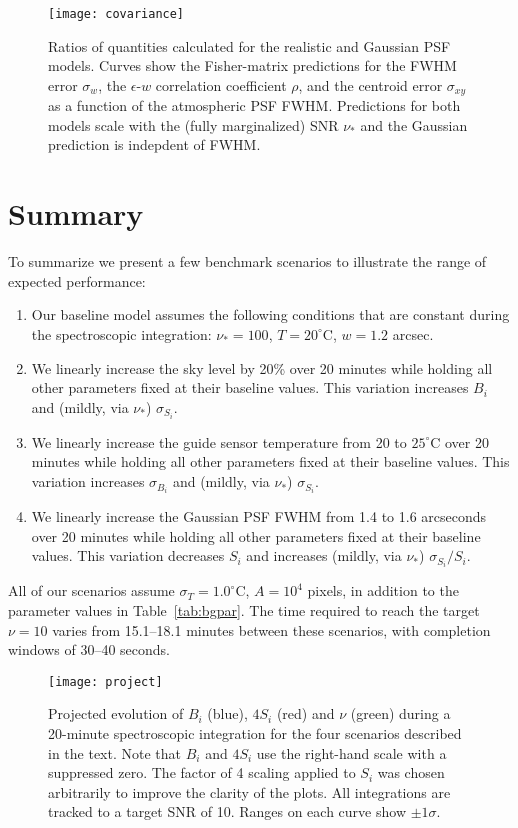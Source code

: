 \documentclass[11pt]{article}
\providecommand{\tab}[1]{Table~\ref{tab:#1}}
\begin{document}
\begin{figure}[h]
\begin{center}
\texttt{[image: covariance]}
\caption{Ratios of quantities calculated for the realistic and Gaussian PSF models.  Curves show the Fisher-matrix predictions for the FWHM error $\sigma_w$, the $\epsilon$-$w$ correlation coefficient $\rho$, and the centroid error $\sigma_{xy}$ as a function of the atmospheric PSF FWHM. Predictions for both models scale with the (fully marginalized) SNR $\nu_\ast$ and the Gaussian prediction is indepdent of FWHM.}
\label{fig:covariance}
\end{center}
\end{figure}

\section{Summary}

To summarize we present a few benchmark scenarios to illustrate the range of expected performance:
\begin{enumerate}
\item Our baseline model assumes the following conditions that are constant during the spectroscopic integration: $\nu_{\ast} = 100$, $T = 20^\circ$C, $w = 1.2$ arcsec.
\item We linearly increase the sky level by 20\% over 20 minutes while holding all other parameters fixed at their baseline values. This variation increases $B_i$ and (mildly, via $\nu_{\ast}$) $\sigma_{S_i}$.
\item We linearly increase the guide sensor temperature from 20 to $25^\circ$C over 20 minutes while holding all other parameters fixed at their baseline values. This variation increases $\sigma_{B_i}$ and (mildly, via $\nu_{\ast}$) $\sigma_{S_i}$.
\item We linearly increase the Gaussian PSF FWHM from 1.4 to 1.6 arcseconds over 20 minutes while holding all other parameters fixed at their baseline values. This variation decreases $S_i$ and increases (mildly, via $\nu_{\ast}$) $\sigma_{S_i}/S_i$.
\end{enumerate}
All of our scenarios assume $\sigma_T = 1.0^\circ$C, $A = 10^4$ pixels, in addition to the parameter values in \tab{bgpar}. The time required to reach the target $\nu = 10$ varies from 15.1--18.1 minutes between these scenarios, with completion windows of 30--40 seconds.

\begin{figure}[htb]
\begin{center}
\texttt{[image: project]}
\caption{Projected evolution of $B_i$ (blue), $4 S_i$ (red) and $\nu$ (green) during a 20-minute spectroscopic integration for the four scenarios described in the text. Note that $B_i$ and $4 S_i$ use the right-hand scale with a suppressed zero.  The factor of 4 scaling applied to $S_i$ was chosen arbitrarily to improve the clarity of the plots. All integrations are tracked to a target SNR of 10. Ranges on each curve show $\pm 1\sigma$.}
\label{fig:project}
\end{center}
\end{figure}
\end{document}
